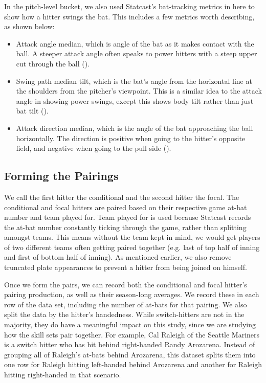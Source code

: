 \documentclass{article}
\begin{document}
In the pitch-level bucket, we also used Statcast's bat-tracking metrics in here to show how a hitter swings the bat. This includes a few metrics worth describing, as shown below:
\begin{itemize}
    \item Attack angle median, which is angle of the bat as it makes contact with the ball. A steeper attack angle often speaks to power hitters with a steep upper cut through the ball (\cite{mlb_attackangle}).
    \item Swing path median tilt, which is the bat's angle from the horizontal line at the shoulders from the pitcher's viewpoint. This is a similar idea to the attack angle in showing power swings, except this shows body tilt rather than just bat tilt (\cite{mlb_swingpathtilt}).
    \item Attack direction median, which is the angle of the bat approaching the ball horizontally. The direction is positive when going to the hitter's opposite field, and negative when going to the pull side (\cite{mlb_attackdirection}).
\end{itemize}

\subsection{Forming the Pairings}

We call the first hitter the conditional and the second hitter the focal. The conditional and focal hitters are paired based on their respective game at-bat number and team played for. Team played for is used because Statcast records the at-bat number constantly ticking through the game, rather than splitting amongst teams. This means without the team kept in mind, we would get players of two different teams often getting paired together (e.g. last of top half of inning and first of bottom half of inning). As mentioned earlier, we also remove truncated plate appearances to prevent a hitter from being joined on himself.

Once we form the pairs, we can record both the conditional and focal hitter's pairing production, as well as their season-long averages. We record these in each row of the data set, including the number of at-bats for that pairing. We also split the data by the hitter's handedness. While switch-hitters are not in the majority, they do have a meaningful impact on this study, since we are studying how the skill sets pair together. For example, Cal Raleigh of the Seattle Mariners is a switch hitter who has hit behind right-handed Randy Arozarena. Instead of grouping all of Raleigh's at-bats behind Arozarena, this dataset splits them into one row for Raleigh hitting left-handed behind Arozarena and another for Raleigh hitting right-handed in that scenario.
\end{document}
